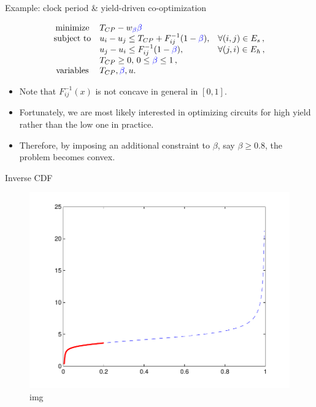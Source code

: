 \documentclass[10pt,ignorenonframetext,serif,onlymath]{beamer}
\providecommand{\tightlist}{%
  \setlength{\itemsep}{0pt}\setlength{\parskip}{0pt}}
\begin{document}
\begin{frame}{Example: clock period \& yield-driven co-optimization}
\protect\hypertarget{example-clock-period-yield-driven-co-optimization}{}

\[\begin{array}{cll}
   \text{minimize} &T_{CP} - w_{\color{blue}\beta} {\color{blue}\beta} \\
   \text{subject to} & u_i - u_j \le T_{CP} + F_{ij}^{-1}(1 - {\color{blue}\beta}), & \forall (i,j) \in E_s \,,\\
                     & u_j - u_i \le F_{ij}^{-1}(1 - {\color{blue}\beta}), & \forall (j,i) \in E_h \,, \\
                     & T_{CP} \ge 0, \, 0 \le {\color{blue}\beta} \le 1 \, , \\
    \text{variables} &T_{CP}, {\color{blue}\beta}, u.
   \end{array}\]

\begin{itemize}
\tightlist
\item
  Note that \(F_{ij}^{-1}(x)\) is not concave in general in \([0, 1]\).
\item
  Fortunately, we are most likely interested in optimizing circuits for
  high yield rather than the low one in practice.
\item
  Therefore, by imposing an additional constraint to \(\beta\), say
  \(\beta \geq 0.8\), the problem becomes convex.
\end{itemize}

\end{frame}

\begin{frame}{Inverse CDF}
\protect\hypertarget{inverse-cdf}{}

\begin{figure}
\centering
\includegraphics{ellipsoid.files/Fig2-b-invcdf.pdf}
\caption{img}
\end{figure}

\end{frame}
\end{document}
